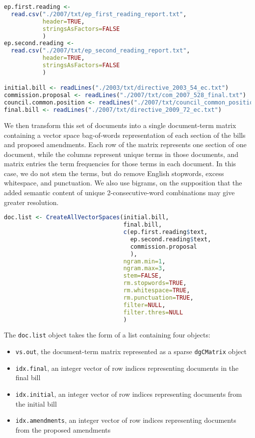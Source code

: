 \documentclass[11pt]{article}
\begin{document}
\begin{lstlisting}[language=R, numbers=none]
ep.first.reading <- 
  read.csv("./2007/txt/ep_first_reading_report.txt",
           header=TRUE,
           stringsAsFactors=FALSE
           )
ep.second.reading <-
  read.csv("./2007/txt/ep_second_reading_report.txt",
           header=TRUE,
           stringsAsFactors=FALSE
           )

initial.bill <- readLines("./2003/txt/directive_2003_54_ec.txt")
commission.proposal <- readLines("./2007/txt/com_2007_528_final.txt")
council.common.position <- readLines("./2007/txt/council_common_position.txt")
final.bill <- readLines("./2007/txt/directive_2009_72_ec.txt")
\end{lstlisting}

We then transform this set of documents into a single document-term
matrix containing a vector space bag-of-words representation of each
section of the bills and proposed amendments. Each row of the matrix represents one section of one document,
while the columns represent unique terms in those documents, and
matrix entries the term frequencies for those terms in each
document. In this case, we do not stem the terms, but do remove
English stopwords, excess whitespace, and punctuation. We also use
bigrams, on the supposition that the added semantic content of unique
2-consecutive-word combinations may give greater resolution.

\begin{lstlisting}[language=R, numbers=none]
doc.list <- CreateAllVectorSpaces(initial.bill,
                                  final.bill,
                                  c(ep.first.reading$text,
                                    ep.second.reading$text,
                                    commission.proposal
                                    ),
                                  ngram.min=1,
                                  ngram.max=3,
                                  stem=FALSE,
                                  rm.stopwords=TRUE,
                                  rm.whitespace=TRUE,
                                  rm.punctuation=TRUE,
                                  filter=NULL,
                                  filter.thres=NULL
                                  )

\end{lstlisting}

The \texttt{doc.list} object takes the form of a list containing four
objects:
\begin{itemize}
\item \texttt{vs.out}, the document-term matrix represented as a
  sparse \texttt{dgCMatrix} object
\item \texttt{idx.final}, an integer vector of row indices
  representing documents in the final bill
\item \texttt{idx.initial}, an integer vector of row indices
  representing documents from the initial bill
\item \texttt{idx.amendments}, an integer vector of row indices
  representing documents from the proposed amendments
\end{itemize} 
\end{document}
